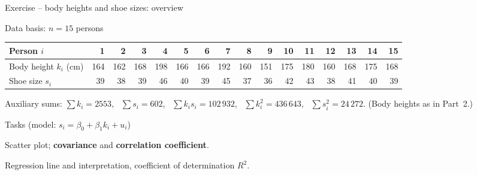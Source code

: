 \documentclass[aspectratio=169,11pt]{beamer}
\begin{document}
\begin{frame}{Exercise -- body heights and shoe sizes: overview}
  \begin{block}{Data basis: $n = 15$ persons}
    \vspace{-4pt}
    \begin{center}
      \footnotesize
      \renewcommand{\arraystretch}{1.1}
      \setlength{\tabcolsep}{3.4pt}
      \begin{tabular}{l*{15}{r}}
        \toprule
        Person $i$         & 1 & 2 & 3 & 4 & 5 & 6 & 7 & 8 & 9 & 10 & 11 & 12 & 13 & 14 & 15 \\
        \midrule
        Body height $k_i$ (cm) & 164 & 162 & 168 & 198 & 166 & 166 & 192 & 160 & 151 & 175 & 180 & 160 & 168 & 175 & 168 \\
        Shoe size $s_i$        & 39 & 38 & 39 & 46 & 40 & 39 & 45 & 37 & 36 & 42 & 43 & 38 & 41 & 40 & 39 \\
        \bottomrule
      \end{tabular}
    \end{center}
    \footnotesize Auxiliary sums: $\sum k_i = 2553$, \ $\sum s_i = 602$, \
    $\sum k_i s_i = 102\,932$, \ $\sum k_i^{2} = 436\,643$, \ $\sum s_i^{2} = 24\,272$.
    (Body heights as in Part~2.)
  \end{block}

  \begin{exampleblock}{Tasks (model: $s_i = \beta_0 + \beta_1 k_i + u_i$)}
    \small
    \begin{description}
      \setlength{\itemsep}{0pt}
      \item[Task 1] Scatter plot; \textbf{covariance} and
            \textbf{correlation coefficient}.
      \item[Task 2] Regression line and interpretation, coefficient of
            determination $R^2$.
    \end{description}
  \end{exampleblock}
\end{frame}
\end{document}
